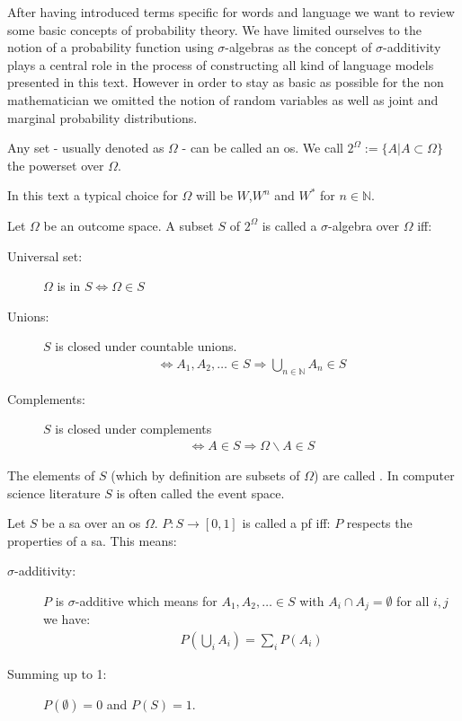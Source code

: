 \documentclass[•]{book}
\begin{document}
After having introduced terms specific for words and language we want to review some basic concepts of probability theory. 
We have limited ourselves to the notion of a probability function using $\sigma$-algebras as the concept of $\sigma$-additivity plays a central role in the process of constructing all kind of language models presented in this text.
However in order to stay as basic as possible for the non mathematician we omitted the notion of random variables as well as joint and marginal probability distributions.

\begin{definition}
Any set - usually denoted as $\Omega$ - can be called an \gls{os}. 
We call $2^\Omega:=\{A| A\subset \Omega\}$ the \gls{powerset} over $\Omega$.
\end{definition}
In this text a typical choice for $\Omega$ will be $W$,$W^n$ and $W^{*}$ for $n\in\mathbb{N}$.

\begin{definition}\label{def:sa}
Let $\Omega$ be an outcome space. 
A subset $S$ of $2^\Omega$ is called a $\sigma$-algebra over $\Omega$ iff:

\begin{description}
\item[Universal set:] $\Omega$ is in $S \Leftrightarrow \Omega \in S$
\item[Unions:] $S$ is closed under countable unions. 
\begin{align}
 \Leftrightarrow A_1,A_2,\dots \in S \Rightarrow \bigcup_{n\in\mathbb{N}}A_n \in S \label{eq:closedUnion}
\end{align}
\item[Complements:] $S$ is closed under complements
\begin{align}
\Leftrightarrow  A\in S \Rightarrow \Omega\backslash A \in S 
\end{align}
\end{description}
The elements of $S$ (which by definition are subsets of $\Omega$) are called .
In computer science literature $S$ is often called the event space.
\end{definition}


\begin{definition}\label{def:pf}
Let $S$ be a \gls{sa} over an \gls{os} $\Omega$. $P:S\longrightarrow [0,1]$ is called a \gls{pf} iff: 
$P$ respects the properties of a \gls{sa}. This means: 
\begin{description}
\item [$\sigma$-additivity:] $P$ is $\sigma$-additive which means for $A_1,A_2,\dots \in S$ with $A_i\cap A_j = \emptyset$ for all $i,j$ we have:
\begin{align}
P(\bigcup_iA_i) = \sum_iP(A_i)
\end{align}
\item[Summing up to 1:] $P(\emptyset)=0$ and $P(S)=1$. 
\end{description}
\end{definition}
\end{document}
